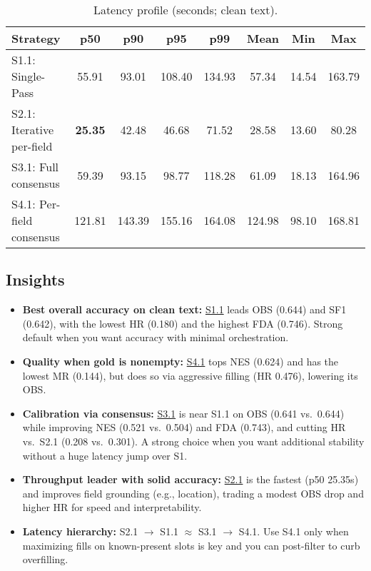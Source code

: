 \begin{table}[h]
    \centering
    \caption{Latency profile (seconds; clean text).}
    \label{tab:latency-comparison}
    \begin{tabular}{lccccccc}
        \toprule
        Strategy & p50 & p90 & p95 & p99 & Mean & Min & Max \\
        \midrule
        S1.1: Single-Pass          & 55.91 & 93.01 & 108.40 & 134.93 & 57.34 & 14.54 & 163.79 \\
        S2.1: Iterative per-field  & \textbf{25.35} & 42.48 & 46.68 & 71.52 & 28.58 & 13.60 & 80.28 \\
        S3.1: Full consensus       & 59.39 & 93.15 & 98.77 & 118.28 & 61.09 & 18.13 & 164.96 \\
        S4.1: Per-field consensus  & 121.81 & 143.39 & 155.16 & 164.08 & 124.98 & 98.10 & 168.81 \\
        \bottomrule
    \end{tabular}
\end{table}

\subsection*{Insights}

\begin{itemize}
    \item \textbf{Best overall accuracy on clean text:} \underline{S1.1} leads OBS (0.644) and SF1 (0.642), with the lowest HR (0.180) and the highest FDA (0.746). Strong default when you want accuracy with minimal orchestration.
    \item \textbf{Quality when gold is nonempty:} \underline{S4.1} tops NES (0.624) and has the lowest MR (0.144), but does so via aggressive filling (HR 0.476), lowering its OBS.
    \item \textbf{Calibration via consensus:} \underline{S3.1} is near S1.1 on OBS (0.641 vs.\ 0.644) while improving NES (0.521 vs.\ 0.504) and FDA (0.743), and cutting HR vs.\ S2.1 (0.208 vs.\ 0.301). A strong choice when you want additional stability without a huge latency jump over S1.
    \item \textbf{Throughput leader with solid accuracy:} \underline{S2.1} is the fastest (p50 25.35s) and improves field grounding (e.g., location), trading a modest OBS drop and higher HR for speed and interpretability.
    \item \textbf{Latency hierarchy:} S2.1 \(\rightarrow\) S1.1 \(\approx\) S3.1 \(\rightarrow\) S4.1. Use S4.1 only when maximizing fills on known-present slots is key and you can post-filter to curb overfilling.
\end{itemize}


